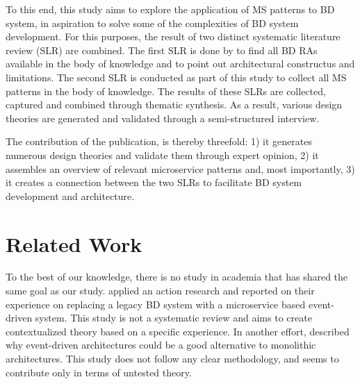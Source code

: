 \documentclass[a4paper,11pt,article,oneside]{memoir}
\begin{document}

To this end, this study aims to explore the application of MS patterns to BD system, in aspiration to solve some of the complexities of BD system development. For this purposes, the result of two distinct systematic literature review (SLR) are combined. The first SLR is done by \citet{ataei2022state} to find all BD RAs available in the body of knowledge and to point out architectural constructus and limitations. The second SLR is conducted as part of this study to collect all MS patterns in the body of knowledge. The results of these SLRs are collected, captured and combined through thematic synthesis. As a result, various design theories are generated and validated through a semi-structured interview.



The contribution of the publication, is thereby threefold: 
1) it generates numerous design theories and validate them through expert opinion, 2) it assembles an overview of relevant microservice patterns and, most importantly, 3) it creates a connection between the two SLRs to facilitate BD system development and architecture.


\chapter{Related Work}

To the best of our knowledge, there is no study in academia that has shared the same goal as our study. \citet{laigner2020monolithic} applied an action research and reported on their experience on replacing a legacy BD system with a microservice based event-driven system. This study is not a systematic review and aims to create contextualized theory based on a specific experience. In another effort, \citet{zhelev2019using} described why event-driven architectures could be a good alternative to monolithic architectures. This study does not follow any clear methodology, and seems to contribute only in terms of untested theory.
\end{document}
